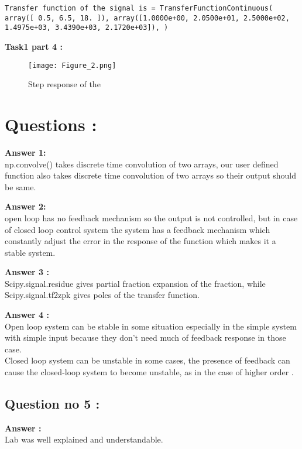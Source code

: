 \documentclass[11pt]{article}
\begin{document}
\begin{verbatim}
Transfer function of the signal is = TransferFunctionContinuous( array([ 0.5, 6.5, 18. ]), array([1.0000e+00, 2.0500e+01, 2.5000e+02, 1.4975e+03, 3.4390e+03, 2.1720e+03]), )
\end{verbatim}



\textbf{Task1 part 4 :}
\begin{figure}[H]
\centering
\texttt{[image: Figure\_2.png]}
\caption{Step response of the }
\label{fig:my_label}
\end{figure}













\section{Questions :}
\textbf{Answer 1:}
\\np.convolve() takes discrete time convolution of two arrays, our user defined function also takes discrete time convolution of two arrays so their output should be same.


\textbf{Answer 2:}
\\open loop has no feedback mechanism so the output is not controlled, but in case of closed loop control system the system has a feedback mechanism which constantly adjust the error in the response of the function which makes it a stable system.

\textbf{Answer 3 :}
\\ Scipy.signal.residue gives partial fraction expansion of the fraction, while Scipy.signal.tf2zpk gives poles of the transfer function. 


\textbf{Answer 4 :}
\\ Open loop system can be stable in some situation especially in the simple system with simple input because they don't need much of feedback response in those case.
\\ Closed loop system can be unstable in some cases, the presence of feedback can cause the closed-loop system to become unstable, as in the case of higher order
.

{\subsection{Question no 5 :} }
\textbf{Answer :}
\\Lab was well explained and understandable.
\end{document}
